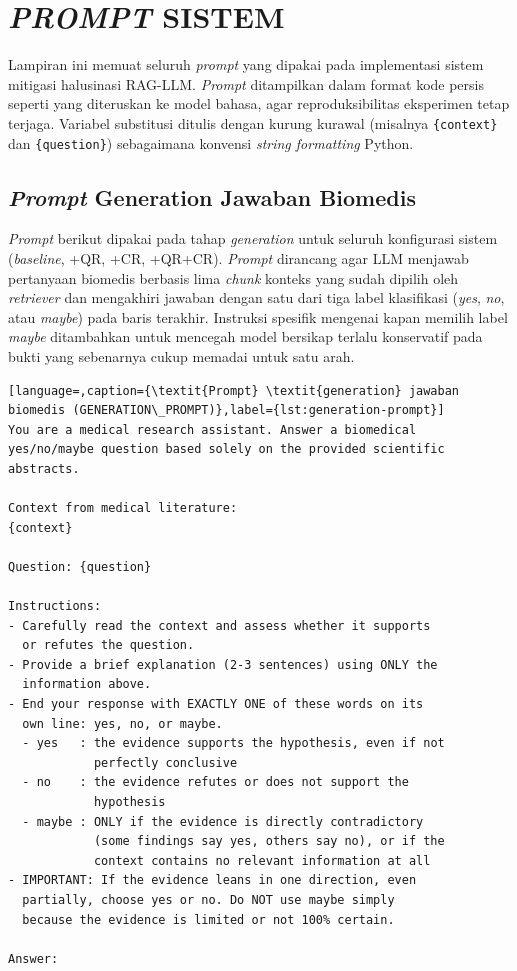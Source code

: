 \cleardoublepage
\chapter{\textit{PROMPT} SISTEM}
\label{lamp:prompt-sistem}

Lampiran ini memuat seluruh \textit{prompt} yang dipakai pada implementasi sistem mitigasi halusinasi RAG-LLM. \textit{Prompt} ditampilkan dalam format kode persis seperti yang diteruskan ke model bahasa, agar reproduksibilitas eksperimen tetap terjaga. Variabel substitusi ditulis dengan kurung kurawal (misalnya \texttt{\{context\}} dan \texttt{\{question\}}) sebagaimana konvensi \textit{string formatting} Python.

\section{\textit{Prompt} Generation Jawaban Biomedis}
\label{lamp:prompt-generation}

\textit{Prompt} berikut dipakai pada tahap \textit{generation} untuk seluruh konfigurasi sistem (\textit{baseline}, +QR, +CR, +QR+CR). \textit{Prompt} dirancang agar LLM menjawab pertanyaan biomedis berbasis lima \textit{chunk} konteks yang sudah dipilih oleh \textit{retriever} dan mengakhiri jawaban dengan satu dari tiga label klasifikasi (\textit{yes}, \textit{no}, atau \textit{maybe}) pada baris terakhir. Instruksi spesifik mengenai kapan memilih label \textit{maybe} ditambahkan untuk mencegah model bersikap terlalu konservatif pada bukti yang sebenarnya cukup memadai untuk satu arah.

\begin{lstlisting}[language=,caption={\textit{Prompt} \textit{generation} jawaban biomedis (GENERATION\_PROMPT)},label={lst:generation-prompt}]
You are a medical research assistant. Answer a biomedical
yes/no/maybe question based solely on the provided scientific
abstracts.

Context from medical literature:
{context}

Question: {question}

Instructions:
- Carefully read the context and assess whether it supports
  or refutes the question.
- Provide a brief explanation (2-3 sentences) using ONLY the
  information above.
- End your response with EXACTLY ONE of these words on its
  own line: yes, no, or maybe.
  - yes   : the evidence supports the hypothesis, even if not
            perfectly conclusive
  - no    : the evidence refutes or does not support the
            hypothesis
  - maybe : ONLY if the evidence is directly contradictory
            (some findings say yes, others say no), or if the
            context contains no relevant information at all
- IMPORTANT: If the evidence leans in one direction, even
  partially, choose yes or no. Do NOT use maybe simply
  because the evidence is limited or not 100% certain.

Answer:
\end{lstlisting}

